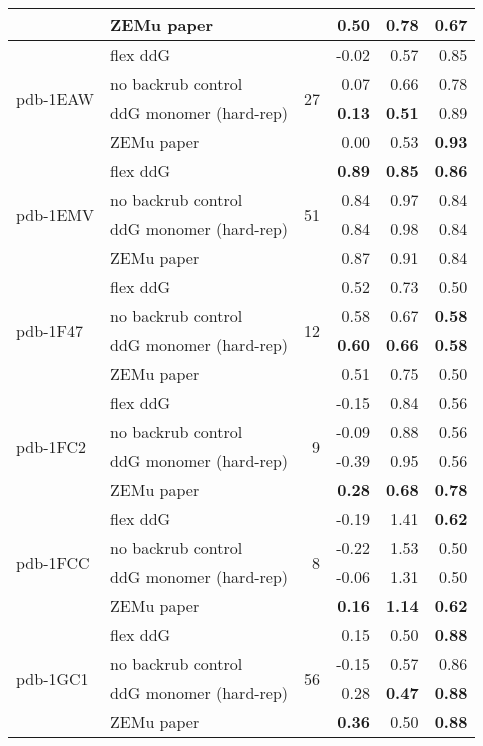 \begin{table}
\begin{tabular}{llrrrr}
 & ZEMu paper & & 0.50 & 0.78 & \textbf{0.67}  \\
\hline
 \multirow{ 4}{*}{pdb-1EAW} & flex ddG & \multirow{ 4}{*}{27} & -0.02 & 0.57 & 0.85  \\
 & no backrub control & & 0.07 & 0.66 & 0.78  \\
 & ddG monomer (hard-rep) & & \textbf{0.13} & \textbf{0.51} & 0.89  \\
 & ZEMu paper & & 0.00 & 0.53 & \textbf{0.93}  \\
\hline
 \multirow{ 4}{*}{pdb-1EMV} & flex ddG & \multirow{ 4}{*}{51} & \textbf{0.89} & \textbf{0.85} & \textbf{0.86}  \\
 & no backrub control & & 0.84 & 0.97 & 0.84  \\
 & ddG monomer (hard-rep) & & 0.84 & 0.98 & 0.84  \\
 & ZEMu paper & & 0.87 & 0.91 & 0.84  \\
\hline
 \multirow{ 4}{*}{pdb-1F47} & flex ddG & \multirow{ 4}{*}{12} & 0.52 & 0.73 & 0.50  \\
 & no backrub control & & 0.58 & 0.67 & \textbf{0.58}  \\
 & ddG monomer (hard-rep) & & \textbf{0.60} & \textbf{0.66} & \textbf{0.58}  \\
 & ZEMu paper & & 0.51 & 0.75 & 0.50  \\
\hline
 \multirow{ 4}{*}{pdb-1FC2} & flex ddG & \multirow{ 4}{*}{9} & -0.15 & 0.84 & 0.56  \\
 & no backrub control & & -0.09 & 0.88 & 0.56  \\
 & ddG monomer (hard-rep) & & -0.39 & 0.95 & 0.56  \\
 & ZEMu paper & & \textbf{0.28} & \textbf{0.68} & \textbf{0.78}  \\
\hline
 \multirow{ 4}{*}{pdb-1FCC} & flex ddG & \multirow{ 4}{*}{8} & -0.19 & 1.41 & \textbf{0.62}  \\
 & no backrub control & & -0.22 & 1.53 & 0.50  \\
 & ddG monomer (hard-rep) & & -0.06 & 1.31 & 0.50  \\
 & ZEMu paper & & \textbf{0.16} & \textbf{1.14} & \textbf{0.62}  \\
\hline
 \multirow{ 4}{*}{pdb-1GC1} & flex ddG & \multirow{ 4}{*}{56} & 0.15 & 0.50 & \textbf{0.88}  \\
 & no backrub control & & -0.15 & 0.57 & 0.86  \\
 & ddG monomer (hard-rep) & & 0.28 & \textbf{0.47} & \textbf{0.88}  \\
 & ZEMu paper & & \textbf{0.36} & 0.50 & \textbf{0.88}  \\

\end{tabular}
\end{table}
